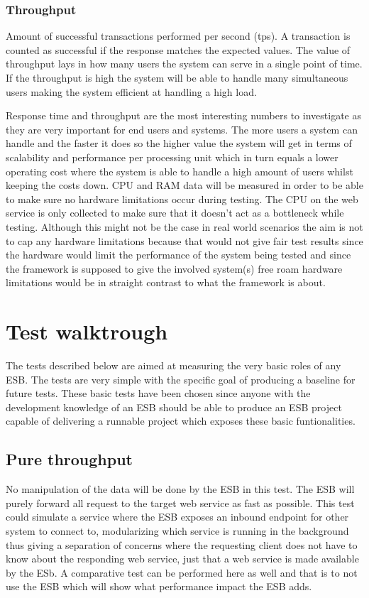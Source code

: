 \subsubsection{Throughput}
Amount of successful transactions performed per second (tps). A transaction is counted as successful if the response matches the expected values.
The value of throughput lays in how many users the system can serve in a single point of time. If the throughput is high the system will be able to handle many simultaneous users making the system efficient at handling a high load.



Response time and throughput are the most interesting numbers to investigate as they are very important for end users and systems. The more users a system can handle and the faster it does so the higher value the system will get in terms of scalability and performance per processing unit which in turn equals a lower operating cost where the system is able to handle a high amount of users whilst keeping the costs down.
CPU and RAM data will be measured in order to be able to make sure no hardware limitations occur during testing. The CPU on the web service is only collected to make sure that it doesn't act as a bottleneck while testing. Although this might not be the case in real world scenarios the aim is not to cap any hardware limitations because that would not give fair test results since the hardware would limit the performance of the system being tested and since the framework is supposed to give the involved system(s) free roam hardware limitations would be in straight contrast to what the framework is about.

\section{Test walktrough}
The tests described below are aimed at measuring the very basic roles of any ESB. 
The tests are very simple with the specific goal of producing a baseline for future tests. 
These basic tests have been chosen since anyone with the development knowledge of an ESB should be able to produce an ESB project capable of delivering a runnable project which exposes these basic funtionalities.

\subsection{Pure throughput}
No manipulation of the data will be done by the ESB in this test. The ESB will purely forward all request to the target web service as fast as possible. 
This test could simulate a service where the ESB exposes an inbound endpoint for other system to connect to, modularizing which service is running in the background thus giving a separation of concerns where the requesting client does not have to know about the responding web service, just that a web service is made available by the ESb.
A comparative test can be performed here as well and that is to not use the ESB which will show what performance impact the ESB adds. 

